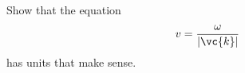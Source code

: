 Show that the equation
\begin{equation*}
  v = \frac{\omega}{|\vc{k}|}
\end{equation*}
has units that make sense.
